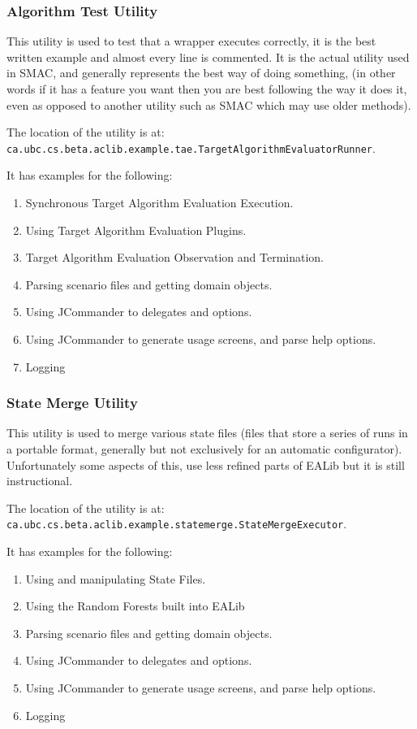 \documentclass[11pt,letterpaper,oneside]{article}
\begin{document}
\subsubsection{Algorithm Test Utility}

This utility is used to test that a wrapper executes correctly, it is the best written example and almost every line is commented. It is the actual utility used in SMAC, and generally represents the best way of doing something, (in other words if it has a feature you want then you are best following the way it does it, even as opposed to another utility such as SMAC which may use older methods).

The location of the utility is at:\\ \texttt{ca.ubc.cs.beta.aclib.example.tae.TargetAlgorithmEvaluatorRunner}.

It has examples for the following:

\begin{enumerate}
\item Synchronous Target Algorithm Evaluation Execution.
\item Using Target Algorithm Evaluation Plugins.
\item Target Algorithm Evaluation Observation and Termination.
\item Parsing scenario files and getting domain objects.
\item Using JCommander to delegates and options.
\item Using JCommander to generate usage screens, and parse help options.
\item Logging
\end{enumerate}

\subsubsection{State Merge Utility}

This utility is used to merge various state files (files that store a series of runs in a portable format, generally but not exclusively for an automatic configurator). Unfortunately some aspects of this, use less refined parts of EALib but it is still instructional.


The location of the utility is at:\\ \texttt{ca.ubc.cs.beta.aclib.example.statemerge.StateMergeExecutor}.

It has examples for the following:

\begin{enumerate}
\item Using and manipulating State Files.
\item Using the Random Forests built into EALib
\item Parsing scenario files and getting domain objects.
\item Using JCommander to delegates and options.
\item Using JCommander to generate usage screens, and parse help options.
\item Logging
\end{enumerate}
\end{document}
